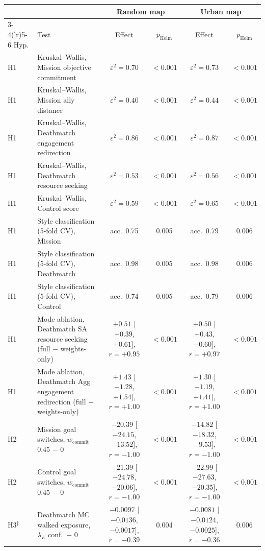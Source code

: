 \begin{tabular}{llcccc}
\toprule
 & & \multicolumn{2}{c}{Random map} & \multicolumn{2}{c}{Urban map} \\
\cmidrule(lr){3-4}\cmidrule(lr){5-6}
Hyp. & Test & Effect & $p_{\mathrm{Holm}}$ & Effect & $p_{\mathrm{Holm}}$ \\
\midrule
H1 & Kruskal--Wallis, Mission objective commitment & $\varepsilon^2=0.70$ & $<0.001$ & $\varepsilon^2=0.73$ & $<0.001$ \\
H1 & Kruskal--Wallis, Mission ally distance & $\varepsilon^2=0.40$ & $<0.001$ & $\varepsilon^2=0.44$ & $<0.001$ \\
H1 & Kruskal--Wallis, Deathmatch engagement redirection & $\varepsilon^2=0.86$ & $<0.001$ & $\varepsilon^2=0.87$ & $<0.001$ \\
H1 & Kruskal--Wallis, Deathmatch resource seeking & $\varepsilon^2=0.53$ & $<0.001$ & $\varepsilon^2=0.56$ & $<0.001$ \\
H1 & Kruskal--Wallis, Control score & $\varepsilon^2=0.59$ & $<0.001$ & $\varepsilon^2=0.65$ & $<0.001$ \\
H1 & Style classification (5-fold CV), Mission & acc.\ 0.75 & 0.005 & acc.\ 0.79 & 0.006 \\
H1 & Style classification (5-fold CV), Deathmatch & acc.\ 0.98 & 0.005 & acc.\ 0.98 & 0.006 \\
H1 & Style classification (5-fold CV), Control & acc.\ 0.74 & 0.005 & acc.\ 0.79 & 0.006 \\
H1 & Mode ablation, Deathmatch SA resource seeking (full $-$ weights-only) & $+0.51$ [$+0.39$, $+0.61$], $r=+0.95$ & $<0.001$ & $+0.50$ [$+0.43$, $+0.60$], $r=+0.97$ & $<0.001$ \\
H1 & Mode ablation, Deathmatch Agg engagement redirection (full $-$ weights-only) & $+1.43$ [$+1.28$, $+1.54$], $r=+1.00$ & $<0.001$ & $+1.30$ [$+1.19$, $+1.41$], $r=+1.00$ & $<0.001$ \\
H2 & Mission goal switches, $w_{\mathrm{commit}}$ 0.45 $-$ 0 & $-20.39$ [$-24.15$, $-13.52$], $r=-1.00$ & $<0.001$ & $-14.82$ [$-18.32$, $-9.53$], $r=-1.00$ & $<0.001$ \\
H2 & Control goal switches, $w_{\mathrm{commit}}$ 0.45 $-$ 0 & $-21.39$ [$-24.78$, $-20.06$], $r=-1.00$ & $<0.001$ & $-22.99$ [$-27.63$, $-20.35$], $r=-1.00$ & $<0.001$ \\
H3$^{\ddagger}$ & Deathmatch MC walked exposure, $\lambda_E$ conf.\ $-$ 0 & $-0.0097$ [$-0.0136$, $-0.0017$], $r=-0.39$ & 0.004 & $-0.0081$ [$-0.0124$, $-0.0025$], $r=-0.36$ & 0.006 \\

\end{tabular}
